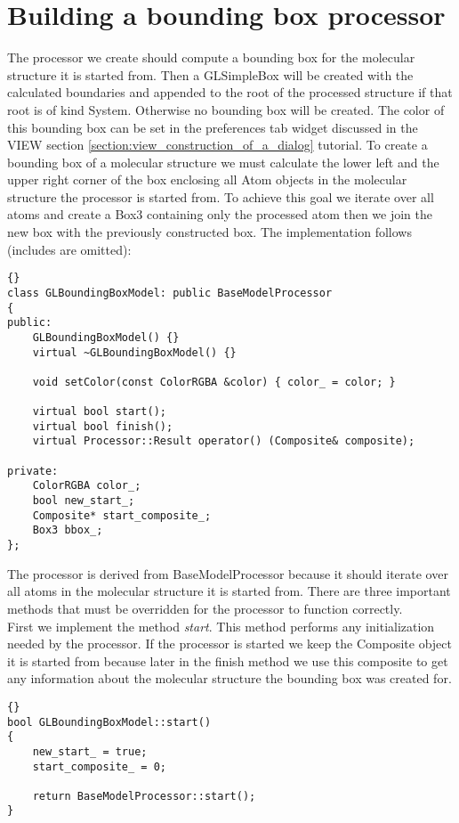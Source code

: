 \section{Building a bounding box processor}
\label{section:bounding_box_processor}

The processor we create should compute a bounding box for the molecular structure
it is started from. Then a GLSimpleBox will be created with the calculated
boundaries and appended to the root of the processed structure if that root is
of kind System. Otherwise no bounding box will be created. The color of this
bounding box can be set in the preferences tab widget discussed in the VIEW section 
\ref{section:view_construction_of_a_dialog} tutorial.
To create a bounding box of a molecular structure we must calculate the lower left 
and the upper right corner of the box enclosing all Atom objects in the molecular
structure the processor is started from. To achieve this goal we iterate over all atoms
and create a Box3 containing only the processed atom then we join the new box
with the previously constructed box.
The implementation follows (includes are omitted):

\begin{lstlisting}{}
class GLBoundingBoxModel: public BaseModelProcessor
{
public:
	GLBoundingBoxModel() {}
	virtual ~GLBoundingBoxModel() {}

	void setColor(const ColorRGBA &color) { color_ = color; }

	virtual bool start();
	virtual bool finish();
	virtual Processor::Result operator() (Composite& composite);

private:
	ColorRGBA color_;
	bool new_start_;
	Composite* start_composite_;
	Box3 bbox_;
};
\end{lstlisting}

The processor is derived from BaseModelProcessor because
it should iterate over all atoms in the molecular structure it is started from.
There are three important methods that must be overridden for the processor
to function correctly.\\
First we implement the method {\em start}. This method performs any initialization
needed by the processor. If the processor is started we keep the Composite object
it is started from because later in the finish method we use this composite to get
any information about the molecular structure the bounding box was created for.

\begin{lstlisting}{}
bool GLBoundingBoxModel::start()
{
	new_start_ = true;
	start_composite_ = 0;

	return BaseModelProcessor::start();
}
\end{lstlisting}

